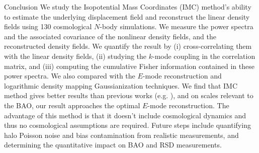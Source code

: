 \begin{section}{Conclusion}
  \label{sec:conclusion}
  We study the Isopotential Mass Coordinates (IMC) method's ability to estimate the underlying displacement 
  field and reconstruct the linear density fields using 130 cosmological $N$-body 
  simulations.  We measure the power spectra and the associated covariance of the 
  nonlinear density fields, and the reconstructed density fields.  We quantify the 
  result by (i) cross-correlating them with the linear density fields, (ii) studying 
  the $k$-mode coupling in the correlation matrix, and (iii) computing the cumulative 
  Fisher information contained in these power spectra.  We also
  compared with the $E$-mode 
  reconstruction and logarithmic density mapping Gaussianization
  techniques.
  We find that IMC method gives better results than previous works
  (e.g. \citealt{bib:Mark2009,bib:Zhang2011,bib:HarnoisD2013}), and on scales 
  relevant to the BAO, our result approaches the optimal $E$-mode reconstruction.  
  The advantage of this method is that it doesn't include cosmological dynamics and thus 
  no cosmological assumptions are required.
  Future steps include quantifying halo Poisson noise and bias contamination 
  from realistic measurements, and determining the quantitative impact on
  BAO and RSD measurements.  

\end{section}
